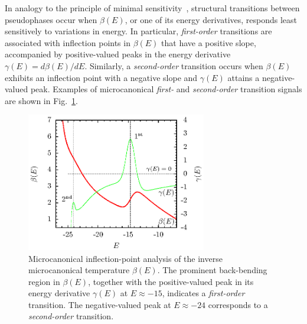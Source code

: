 \documentclass[12pt]{report}
\begin{document}
In analogy to the principle of minimal sensitivity~\cite{Stevenson}, structural transitions between pseudophases occur when $\beta (E)$, or one of its energy
derivatives, responds least sensitively to variations in energy. In particular, \textit{first-order} transitions are associated with inflection points in $\beta (E)$ that have a positive slope, accompanied by positive-valued peaks in the energy derivative $\gamma(E)=d\beta(E)/dE$. Similarly, a \textit{second-order} transition occurs when $\beta(E)$ exhibits an inflection point with a negative slope and $\gamma(E)$ attains a negative-valued peak. Examples of microcanonical \textit{first-} and \textit{second-order} transition signals are shown in Fig.~\ref{fig:Fig_1}.
%
\begin{figure}
\center
\includegraphics[width = 0.7\textwidth]{chapter2Figs/MicroAnalysisExample.eps}
\caption{\label{fig:Fig_1}%
Microcanonical inflection-point analysis of the inverse microcanonical temperature $\beta(E)$. The prominent back-bending region in $\beta(E)$, together with the positive-valued peak in its energy derivative $\gamma(E)$ at $E \approx -15$, indicates a \textit{first-order} transition. The negative-valued peak at $E\approx -24$ corresponds to a \textit{second-order} transition.}
\end{figure}
%
\end{document}
